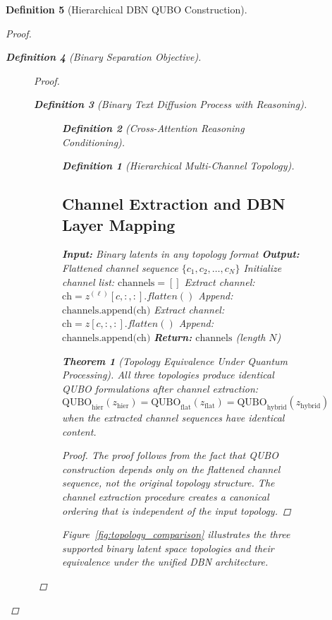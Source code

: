 \documentclass{article}
\newtheorem{theorem}{Theorem}
\newtheorem{definition}{Definition}
\begin{document}
\begin{definition}[Hierarchical DBN QUBO Construction]
\begin{proof}
\begin{definition}[Binary Separation Objective]
\begin{figure}[H]
\begin{proof}
\begin{definition}[Binary Text Diffusion Process with Reasoning]
\begin{figure}[H]
\begin{definition}[Cross-Attention Reasoning Conditioning]
\begin{definition}[Hierarchical Multi-Channel Topology]
\subsection{Channel Extraction and DBN Layer Mapping}

\begin{algorithm}
\caption{Universal Channel Extraction for All Topologies}
\begin{algorithmic}[1]
\STATE \textbf{Input:} Binary latents in any topology format
\STATE \textbf{Output:} Flattened channel sequence $\{c_1, c_2, \ldots, c_N\}$
\STATE Initialize channel list: $\text{channels} = []$
            \STATE Extract channel: $\text{ch} = z^{(\ell)}[c, :, :].flatten()$
            \STATE Append: $\text{channels.append(ch)}$
        \ENDFOR
    \ENDFOR
{}
        \STATE Extract channel: $\text{ch} = z[c, :, :].flatten()$
        \STATE Append: $\text{channels.append(ch)}$
    \ENDFOR
\ENDIF
\STATE \textbf{Return:} $\text{channels}$ (length $N$)
\end{algorithmic}
\end{algorithm}

\begin{theorem}[Topology Equivalence Under Quantum Processing]
All three topologies produce identical QUBO formulations after channel extraction:
\begin{equation}
\text{QUBO}_{\text{hier}}(z_{\text{hier}}) = \text{QUBO}_{\text{flat}}(z_{\text{flat}}) = \text{QUBO}_{\text{hybrid}}(z_{\text{hybrid}})
\end{equation}
when the extracted channel sequences have identical content.
\end{theorem}

\begin{proof}
The proof follows from the fact that QUBO construction depends only on the flattened channel sequence, not the original topology structure. The channel extraction procedure creates a canonical ordering that is independent of the input topology.
\end{proof}

Figure~\ref{fig:topology_comparison} illustrates the three supported binary latent space topologies and their equivalence under the unified DBN architecture.


\end{definition}
\end{definition}
\end{figure}
\end{definition}
\end{proof}
\end{figure}
\end{definition}
\end{proof}
\end{definition}
\end{document}
